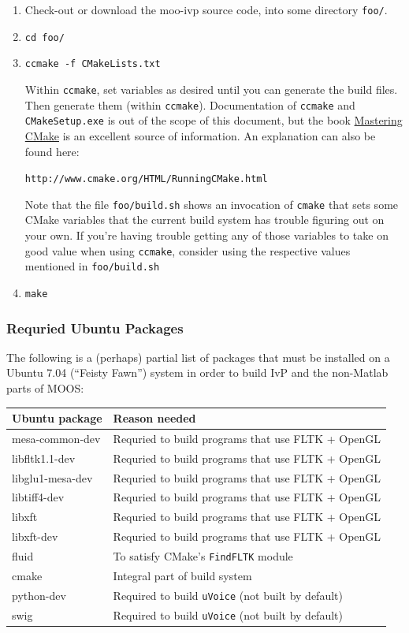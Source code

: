 \documentclass[letterpaper,10pt]{article}
\begin{document}
\begin{enumerate}
 \item Check-out or download the moo-ivp source code, into some directory \verb|foo/|.
 \item \verb|cd foo/|
 \item \verb|ccmake -f CMakeLists.txt|

	Within \verb|ccmake|, set variables as desired until you can generate the
	build files.  Then generate them (within \verb|ccmake|).  Documentation of
	\verb|ccmake| and \verb|CMakeSetup.exe| is out of the scope of this document,
	but the book \underline{Mastering CMake} is an excellent source of information.
	An explanation can also be found here: 

	\verb|http://www.cmake.org/HTML/RunningCMake.html|

	Note that the file \verb|foo/build.sh| shows an invocation of \verb|cmake| that
	sets some CMake variables that the current build system has trouble figuring
	out on your own.  If you're having trouble getting any of those variables to
	take on good value when using \verb|ccmake|, consider using the respective
	values mentioned in \verb|foo/build.sh|

\item \verb|make|

\end{enumerate}


\subsubsection{Requried Ubuntu Packages}
The following is a (perhaps) partial list of packages that must be installed on a 
Ubuntu 7.04 (``Feisty Fawn'') system in order to build IvP and the non-Matlab parts
of MOOS:
\begin{center}
\begin{tabular}{|l|l|}
\hline
Ubuntu package & Reason needed \\
\hline
\hline
mesa-common-dev & Requried to build programs that use FLTK + OpenGL \\
\hline
libfltk1.1-dev & Requried to build programs that use FLTK + OpenGL \\
\hline
libglu1-mesa-dev & Requried to build programs that use FLTK + OpenGL \\
\hline
libtiff4-dev & Requried to build programs that use FLTK + OpenGL \\
\hline
libxft & Requried to build programs that use FLTK + OpenGL \\
\hline
libxft-dev & Requried to build programs that use FLTK + OpenGL \\
\hline
fluid & To satisfy CMake's \verb|FindFLTK| module \\
\hline
cmake & Integral part of build system \\
\hline
python-dev & Required to build \verb|uVoice| (not built by default) \\
\hline
swig & Required to build \verb|uVoice| (not built by default) \\
\hline
\end{tabular}
\end{center}
\end{document}
